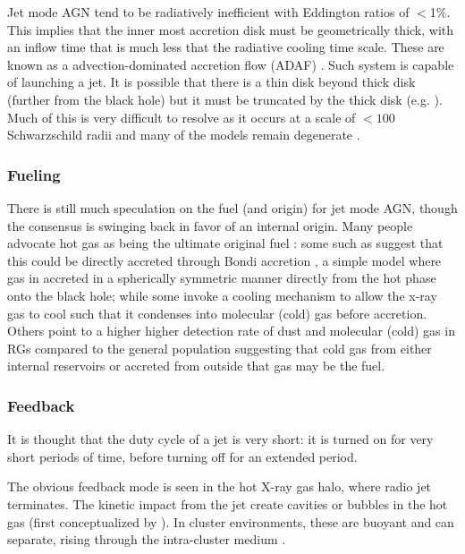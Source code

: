 		Jet mode AGN tend to be radiatively inefficient with Eddington ratios of $<$1\%. This implies that the inner most accretion disk must be geometrically thick, with an inflow time that is much less that the radiative cooling time scale. These are known as a advection-dominated accretion flow (ADAF) \citep{Narayan1994}. Such system is capable of launching a jet. It is possible that there is a thin disk beyond thick disk (further from the black hole) but it must be truncated by the thick disk (e.g. \citet{Abramowicz2002}). Much of this is very difficult to resolve as it occurs at a scale of $< 100$ Schwarzschild radii and many of the models remain degenerate \citep{Quataert1999}. 

		\subsubsection{Fueling}
			\label{subsubsec:JetFueling}
			There is still much speculation on the fuel (and origin) for jet mode AGN, though the consensus is swinging back in favor of an internal origin. Many people advocate hot gas as being the ultimate original fuel \citep{Allen2006}: some such as \citet{Hardcastle2007a} suggest that this could be directly accreted through Bondi accretion \citep{Bondi1952}, a simple model where gas in accreted in a spherically symmetric manner directly from the hot phase onto the black hole; while some invoke a cooling mechanism to allow the x-ray gas to cool such that it condenses into molecular (cold) gas before accretion. Others point to a higher higher detection rate of dust and molecular (cold) gas in RGs compared to the general population \citep{Lim2000, Lim2003, DeRuiter2002, VerdoesKleijn2005} suggesting that cold gas from either internal reservoirs or accreted from outside that gas may be the fuel.

		\subsubsection{Feedback}
			\label{subsubsection:JetFeedback}
			It is thought that the duty cycle of a jet is very short: it is turned on for very short periods of time, before turning off for an extended period. 

			The obvious feedback mode is seen in the hot X-ray gas halo, where radio jet terminates. The kinetic impact from the jet create cavities or bubbles in the hot gas (first conceptualized by \cite{Gull1973}). In cluster environments, these are buoyant and can separate, rising through the intra-cluster medium \citep{Churazov2000, Churazov2001, McNamara2000}. 

